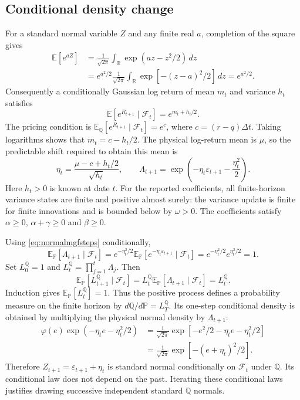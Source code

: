 \documentclass[11pt,a4paper]{article}
\newcommand{\E}{\mathbb E}
\newcommand{\Pp}{\mathbb P}
\newcommand{\Q}{\mathbb Q}
\newcommand{\F}{\mathcal F}
\newcommand{\dt}{\Delta t}
\theoremstyle{remark}
\begin{document}
\subsection{Conditional density change}
For a standard normal variable $Z$ and any finite real $a$, completion of the square gives
\begin{align}
 \E[e^{aZ}]&=\frac1{\sqrt{2\pi}}
       \int_{\mathbb R}\exp(az-z^2/2)\,dz\nonumber\\
 &=e^{a^2/2}\frac1{\sqrt{2\pi}}
       \int_{\mathbb R}\exp[-(z-a)^2/2]\,dz
 =e^{a^2/2}.
 \label{eq:normalmgfsteps}
\end{align}
Consequently a conditionally Gaussian log return of mean $m_t$ and variance $h_t$ satisfies
\begin{equation}
 \E[e^{R_{t+1}}\mid\F_t]=e^{m_t+h_t/2}.
\end{equation}
The pricing condition is $\E_{\Q}[e^{R_{t+1}}\mid\F_t]=e^c$, where $c=(r-q)\dt$. Taking logarithms shows that $m_t=c-h_t/2$. The physical log-return mean is $\mu$, so the predictable shift required to obtain this mean is
\begin{equation}
 \eta_t=\frac{\mu-c+h_t/2}{\sqrt{h_t}},\qquad
 \Lambda_{t+1}=\exp\!\left(-\eta_t\varepsilon_{t+1}
                                    -\frac{\eta_t^2}{2}\right).
 \label{eq:measurechange}
\end{equation}
Here $h_t>0$ is known at date $t$. For the reported coefficients, all finite-horizon variance states are finite and positive almost surely: the variance update is finite for finite innovations and is bounded below by $\omega>0$. The coefficients satisfy $\alpha\geq0$, $\alpha+\gamma\geq0$ and $\beta\geq0$.

Using \eqref{eq:normalmgfsteps} conditionally,
\begin{equation}
 \E_{\Pp}[\Lambda_{t+1}\mid\F_t]
 =e^{-\eta_t^2/2}\E_{\Pp}[e^{-\eta_t\varepsilon_{t+1}}\mid\F_t]
 =e^{-\eta_t^2/2}e^{\eta_t^2/2}=1.
\end{equation}
Set $L_0^{\Q}=1$ and $L_t^{\Q}=\prod_{j=1}^t\Lambda_j$. Then
\begin{equation}
 \E_{\Pp}[L_{t+1}^{\Q}\mid\F_t]
 =L_t^{\Q}\E_{\Pp}[\Lambda_{t+1}\mid\F_t]=L_t^{\Q}.
\end{equation}
Induction gives $\E_{\Pp}[L_t^{\Q}]=1$. Thus the positive process defines a probability measure on the finite horizon by $d\Q/d\Pp=L_T^{\Q}$. Its one-step conditional density is obtained by multiplying the physical normal density by $\Lambda_{t+1}$:
\begin{align}
 \varphi(e)\exp(-\eta_te-\eta_t^2/2)
 &=\frac1{\sqrt{2\pi}}
      \exp[-e^2/2-\eta_te-\eta_t^2/2]\nonumber\\
 &=\frac1{\sqrt{2\pi}}\exp[-(e+\eta_t)^2/2].
\end{align}
Therefore $Z_{t+1}=\varepsilon_{t+1}+\eta_t$ is standard normal conditionally on $\F_t$ under $\Q$. Its conditional law does not depend on the past. Iterating these conditional laws justifies drawing successive independent standard $\Q$ normals.
\end{document}
